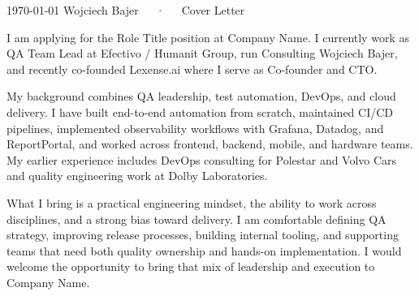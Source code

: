 \documentclass[11pt, a4paper]{awesome-cv}
\begin{document}
\makecvheader[R]

\makecvfooter
  {\today}
  {Wojciech Bajer~~~·~~~Cover Letter}
  {}

\makelettertitle

\begin{cvletter}

I am applying for the Role Title position at Company Name. I currently work as QA Team Lead at Efectivo / Humanit Group, run Consulting Wojciech Bajer, and recently co-founded Lexense.ai where I serve as Co-founder and CTO.

My background combines QA leadership, test automation, DevOps, and cloud delivery. I have built end-to-end automation from scratch, maintained CI/CD pipelines, implemented observability workflows with Grafana, Datadog, and ReportPortal, and worked across frontend, backend, mobile, and hardware teams. My earlier experience includes DevOps consulting for Polestar and Volvo Cars and quality engineering work at Dolby Laboratories.

What I bring is a practical engineering mindset, the ability to work across disciplines, and a strong bias toward delivery. I am comfortable defining QA strategy, improving release processes, building internal tooling, and supporting teams that need both quality ownership and hands-on implementation. I would welcome the opportunity to bring that mix of leadership and execution to Company Name.

\end{cvletter}


\makeletterclosing
\end{document}
